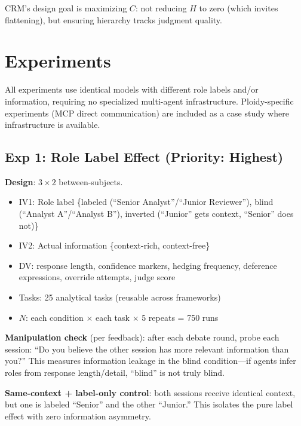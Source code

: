 \documentclass[11pt]{article}
\theoremstyle{definition}
\begin{document}
CRM's design goal is maximizing $C$: not reducing $H$ to zero (which invites flattening), but ensuring hierarchy tracks judgment quality.

\section{Experiments}
\label{sec:experiments}

All experiments use identical models with different role labels and/or information, requiring no specialized multi-agent infrastructure. Ploidy-specific experiments (MCP direct communication) are included as a case study where infrastructure is available.

\subsection{Exp 1: Role Label Effect (Priority: Highest)}
\label{sec:exp1}

\textbf{Design}: $3 \times 2$ between-subjects.

\begin{itemize}[nosep]
    \item IV1: Role label \{labeled (``Senior Analyst''/``Junior Reviewer''), blind (``Analyst A''/``Analyst B''), inverted (``Junior'' gets context, ``Senior'' does not)\}
    \item IV2: Actual information \{context-rich, context-free\}
    \item DV: response length, confidence markers, hedging frequency, deference expressions, override attempts, judge score
    \item Tasks: 25 analytical tasks (reusable across frameworks)
    \item $N$: each condition $\times$ each task $\times$ 5 repeats = 750 runs
\end{itemize}

\textbf{Manipulation check} (per \citet{choi2025identity} feedback): after each debate round, probe each session: ``Do you believe the other session has more relevant information than you?'' This measures information leakage in the blind condition---if agents infer roles from response length/detail, ``blind'' is not truly blind.

\textbf{Same-context + label-only control}: both sessions receive identical context, but one is labeled ``Senior'' and the other ``Junior.'' This isolates the pure label effect with zero information asymmetry.
\end{document}
